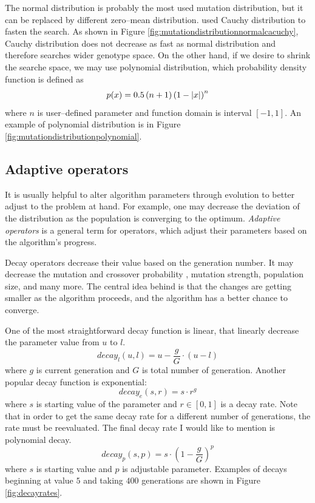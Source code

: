 The normal distribution is probably the most used mutation distribution, but it can be replaced by different zero--mean distribution. \citet*{CauchyDistributionMutation} used Cauchy distribution to fasten the search. As shown in Figure \ref{fig:mutationdistributionnormalcacuchy}, Cauchy distribution does not decrease as fast as normal distribution and therefore searches wider genotype space. On the other hand, if we desire to shrink the searche space, we may use polynomial distribution, which probability density function is defined as
$$
p(x)=0.5 \left(n + 1\right)\left( 1 - \left|{x}\right| \right)^n
$$ 
where $n$ is user--defined parameter and function domain is interval $\left[-1,1\right]$. An example of polynomial distribution is in Figure \ref{fig:mutationdistributionpolynomial}.

\subsection{Adaptive operators}
\label{chap:adaptiveoperators}

It is usually helpful to alter algorithm parameters through evolution to better adjust to the problem at hand. For example, one may decrease the deviation of the distribution as the population is converging to the optimum. \emph{Adaptive operators} is a general term for operators, which adjust their parameters based on the algorithm's progress.

Decay operators decrease their value based on the generation number. It may decrease the mutation and crossover probability \citep{DecayGA}, mutation strength, population size, and many more. The central idea behind is that the changes are getting smaller as the algorithm proceeds, and the algorithm has a better chance to converge.

One of the most straightforward decay function is linear, that linearly decrease the parameter value from $u$ to $l$.
$$
decay_l(u,l) = u - \frac{g}{G}\cdot\left( u - l \right)
$$
where $g$ is current generation and $G$ is total number of generation. Another popular decay function is exponential:
$$
decay_e(s,r) = s\cdot r^g
$$
where $s$ is starting value of the parameter and $r\in\left[0,1\right]$ is a decay rate. Note that in order to get the same decay rate for a different number of generations, the rate must be reevaluated.
The final decay rate I would like to mention is polynomial decay.
$$
decay_p(s,p) = s \cdot\left(1 - \frac{g}{G}\right)^p
$$
where $s$ is starting value and $p$ is adjustable parameter. Examples of decays beginning at value $5$ and taking $400$ generations are shown in Figure \ref{fig:decayrates}.

